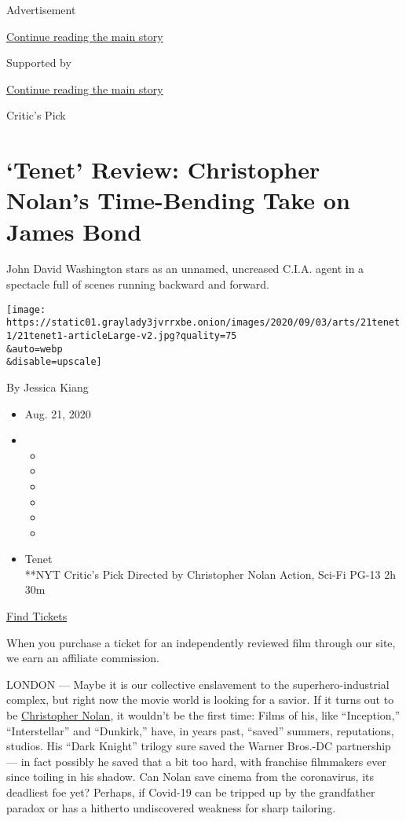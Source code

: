 Advertisement

\protect\hyperlink{after-top}{Continue reading the main story}

Supported by

\protect\hyperlink{after-sponsor}{Continue reading the main story}

Critic's Pick

\hypertarget{tenet-review-christopher-nolans-time-bending-take-on-james-bond}{%
\section{`Tenet' Review: Christopher Nolan's Time-Bending Take on James
Bond}\label{tenet-review-christopher-nolans-time-bending-take-on-james-bond}}

John David Washington stars as an unnamed, uncreased C.I.A. agent in a
spectacle full of scenes running backward and forward.

\texttt{[image: https://static01.graylady3jvrrxbe.onion/images/2020/09/03/arts/21tenet1/21tenet1-articleLarge-v2.jpg?quality=75\\\&auto=webp\\\&disable=upscale]}

By Jessica Kiang

\begin{itemize}
\item
  Aug. 21, 2020
\item
  \begin{itemize}
  \item
  \item
  \item
  \item
  \item
  \item
  \end{itemize}
\end{itemize}

\begin{itemize}
\tightlist
\item
  Tenet\\
  **NYT Critic's Pick Directed by Christopher Nolan Action, Sci-Fi PG-13
  2h 30m
\end{itemize}

\href{https://www.imdb.com/showtimes/title/tt6723592?ref_=ref_ext_NYT}{Find
Tickets}

When you purchase a ticket for an independently reviewed film through
our site, we earn an affiliate commission.

LONDON --- Maybe it is our collective enslavement to the
superhero-industrial complex, but right now the movie world is looking
for a savior. If it turns out to be
\href{https://www.nytimes3xbfgragh.onion/2017/07/12/movies/dunkirk-christopher-nolan-interview.html}{Christopher
Nolan}, it wouldn't be the first time: Films of his, like ``Inception,''
``Interstellar'' and ``Dunkirk,'' have, in years past, ``saved''
summers, reputations, studios. His ``Dark Knight'' trilogy sure saved
the Warner Bros.-DC partnership --- in fact possibly he saved that a bit
too hard, with franchise filmmakers ever since toiling in his shadow.
Can Nolan save cinema from the coronavirus, its deadliest foe yet?
Perhaps, if Covid-19 can be tripped up by the grandfather paradox or has
a hitherto undiscovered weakness for sharp tailoring.

